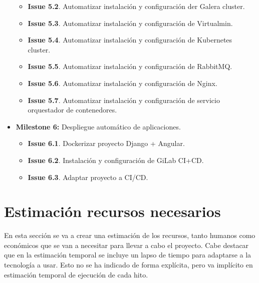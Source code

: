 \begin{text}
\begin{itemize}
\begin{itemize}
			\item \textbf{Issue 5.2}. Automatizar instalación y configuración der Galera cluster.
			\item \textbf{Issue 5.3}. Automatizar instalación y configuración de Virtualmin.
			\item \textbf{Issue 5.4}. Automatizar instalación y configuración de Kubernetes cluster.
			\item \textbf{Issue 5.5}. Automatizar instalación y configuración de RabbitMQ.
			\item \textbf{Issue 5.6}. Automatizar instalación y configuración de Nginx.
			\item \textbf{Issue 5.7}. Automatizar instalación y configuración de servicio orquestador de contenedores.
		\end{itemize}
		\item \textbf{Milestone 6:} Despliegue automático de aplicaciones.
		\begin{itemize}
			\item \textbf{Issue 6.1}. Dockerizar proyecto Django + Angular.
			\item \textbf{Issue 6.2}. Instalación y configuración de GiLab CI+CD.
			\item \textbf{Issue 6.3}. Adaptar proyecto a CI/CD.
		\end{itemize}
	\end{itemize}
\end{text}

\section{Estimación recursos necesarios}
\begin{text}
        En esta sección se va a crear una estimación de los recursos, tanto humanos como económicos que se van a necesitar para llevar a cabo el proyecto. Cabe destacar que en la estimación temporal se incluye un lapso de tiempo para adaptarse a la tecnología a usar. Esto no se ha indicado de forma explícita, pero va implícito en estimación temporal de ejecución de cada hito. \\ 

\end{text}
